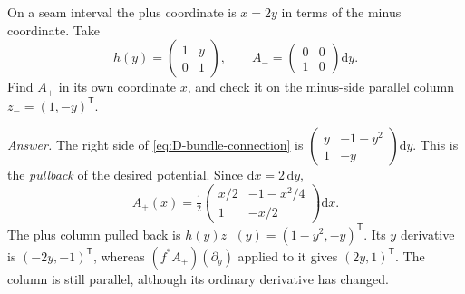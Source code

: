 \begin{exercise}
On a seam interval the plus coordinate is $x=2y$ in terms of the minus coordinate. Take
\[
 h(y)=\begin{pmatrix}1&y\\0&1\end{pmatrix},\qquad
 A_-=\begin{pmatrix}0&0\\1&0\end{pmatrix}\mathrm{d}y .
\]
Find $A_+$ in its own coordinate $x$, and check it on the minus-side parallel column $z_-=(1,-y)^{\mathsf T}$.

\emph{Answer.} The right side of \eqref{eq:D-bundle-connection} is $\left(\begin{smallmatrix}y&-1-y^2\\1&-y\end{smallmatrix}\right)\mathrm{d}y$. This is the \emph{pullback} of the desired potential. Since $\mathrm{d}x=2\,\mathrm{d}y$,
\[
 A_+(x)=\tfrac12\begin{pmatrix}x/2&-1-x^2/4\\1&-x/2\end{pmatrix}\mathrm{d}x .
\]
The plus column pulled back is $h(y)z_-(y)=(1-y^2,-y)^{\mathsf T}$. Its $y$ derivative is $(-2y,-1)^{\mathsf T}$, whereas $(f^*A_+)(\partial_y)$ applied to it gives $(2y,1)^{\mathsf T}$. The column is still parallel, although its ordinary derivative has changed.
\end{exercise}
